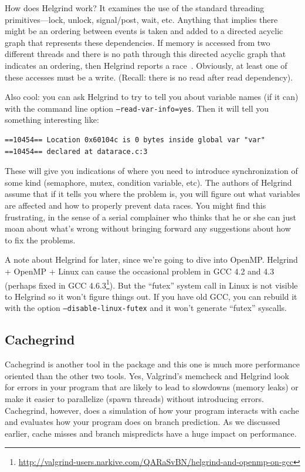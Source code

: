 \documentclass[a4paper]{report}
\begin{document}
How does Helgrind work? It examines the use of the standard threading primitives---lock, unlock, signal/post, wait, etc. Anything that implies there might be an ordering between events is taken and added to a directed acyclic graph that represents these dependencies. If memory is accessed from two different threads and there is no path through this directed acyclic graph that indicates an ordering, then Helgrind reports a race~\cite{helgrind}. Obviously, at least one of these accesses must be a write. (Recall: there is no read after read dependency).

Also cool: you can ask Helgrind to try to tell you about variable names (if it can) with the command line option \texttt{--read-var-info=yes}. Then it will tell you something interesting like:

\begin{verbatim}
==10454== Location 0x60104c is 0 bytes inside global var "var"
==10454== declared at datarace.c:3
\end{verbatim}

These will give you indications of where you need to introduce synchronization of some kind (semaphore, mutex, condition variable, etc). The authors of Helgrind assume that if it tells you where the problem is, you will figure out what variables are affected and how to properly prevent data races. You might find this frustrating, in the sense of a serial complainer who thinks that he or she can just moan about what's wrong without bringing forward any suggestions about how to fix the problems. 

A note about Helgrind for later, since we're going to dive into OpenMP. Helgrind + OpenMP + Linux can cause the occasional problem in GCC 4.2 and 4.3 (perhaps fixed in GCC 4.6.3\footnote{\url{http://valgrind-users.narkive.com/QARaSvBN/helgrind-and-openmp-on-gcc}}). But the ``futex'' system call in Linux is not visible to Helgrind so it won't figure things out. If you have old GCC, you can rebuild it with the option \texttt{--disable-linux-futex} and it won't generate ``futex'' syscalls.

\subsection*{Cachegrind}

Cachegrind is another tool in the package and this one is much more performance oriented than the other two tools. Yes, Valgrind's memcheck and Helgrind look for errors in your program that are likely to lead to slowdowns (memory leaks) or make it easier to parallelize (spawn threads) without introducing errors. Cachegrind, however, does a simulation of how your program interacts with cache and evaluates how your program does on branch prediction. As we discussed earlier, cache misses and branch mispredicts have a huge impact on performance.
\end{document}
